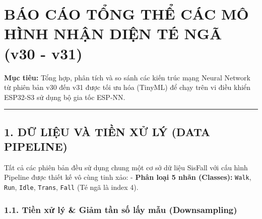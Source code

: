 \documentclass[12pt,a4paper]{article}
\begin{document}
\section{BÁO CÁO TỔNG THỂ CÁC MÔ HÌNH NHẬN DIỆN TÉ NGÃ (v30 -
v31)}\label{buxe1o-cuxe1o-tux1ed5ng-thux1ec3-cuxe1c-muxf4-huxecnh-nhux1eadn-diux1ec7n-tuxe9-nguxe3-v30---v31}

\textbf{Mục tiêu:} Tổng hợp, phân tích và so sánh các kiến trúc mạng
Neural Network từ phiên bản v30 đến v31 được tối ưu hóa (TinyML) để chạy
trên vi điều khiển ESP32-S3 sử dụng bộ gia tốc ESP-NN.

\begin{center}\rule{0.5\linewidth}{0.5pt}\end{center}

\subsection{1. DỮ LIỆU VÀ TIỀN XỬ LÝ (DATA
PIPELINE)}\label{dux1eef-liux1ec7u-vuxe0-tiux1ec1n-xux1eed-luxfd-data-pipeline}

Tất cả các phiên bản đều sử dụng chung một cơ sở dữ liệu SisFall với cấu
hình Pipeline được thiết kế vô cùng tinh xảo: - \textbf{Phân loại 5 nhãn
(Classes):} \texttt{Walk}, \texttt{Run}, \texttt{Idle}, \texttt{Trans},
\texttt{Fall} (Té ngã là index 4).

\subsubsection{1.1. Tiền xử lý \& Giảm tần số lấy mẫu
(Downsampling)}\label{tiux1ec1n-xux1eed-luxfd-giux1ea3m-tux1ea7n-sux1ed1-lux1ea5y-mux1eabu-downsampling}
\end{document}
